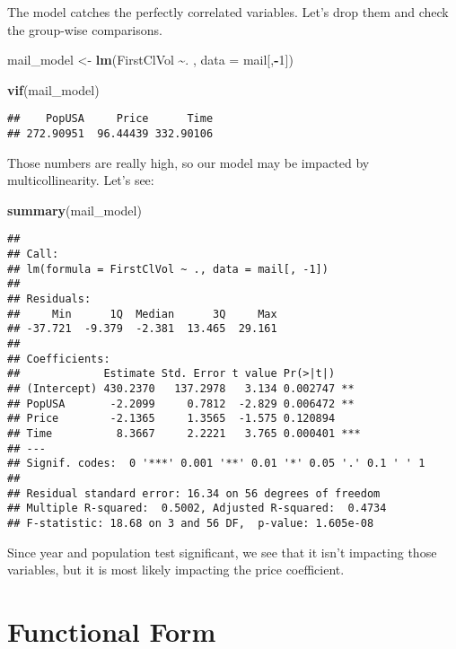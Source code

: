 \documentclass[
]{article}
\newenvironment{Shaded}{\begin{snugshade}}{\end{snugshade}}
\newcommand{\AttributeTok}[1]{\textcolor[rgb]{0.13,0.29,0.53}{#1}}
\newcommand{\DecValTok}[1]{\textcolor[rgb]{0.00,0.00,0.81}{#1}}
\newcommand{\FunctionTok}[1]{\textcolor[rgb]{0.13,0.29,0.53}{\textbf{#1}}}
\newcommand{\NormalTok}[1]{#1}
\newcommand{\OtherTok}[1]{\textcolor[rgb]{0.56,0.35,0.01}{#1}}
\newcommand{\SpecialCharTok}[1]{\textcolor[rgb]{0.81,0.36,0.00}{\textbf{#1}}}
\begin{document}
The model catches the perfectly correlated variables. Let's drop them
and check the group-wise comparisons.

\begin{Shaded}
\begin{Highlighting}[]
\NormalTok{mail\_model }\OtherTok{\textless{}{-}} \FunctionTok{lm}\NormalTok{(FirstClVol }\SpecialCharTok{\textasciitilde{}}\NormalTok{. , }\AttributeTok{data =}\NormalTok{ mail[,}\SpecialCharTok{{-}}\DecValTok{1}\NormalTok{])}

\FunctionTok{vif}\NormalTok{(mail\_model)}
\end{Highlighting}
\end{Shaded}

\begin{verbatim}
##    PopUSA     Price      Time 
## 272.90951  96.44439 332.90106
\end{verbatim}

Those numbers are really high, so our model may be impacted by
multicollinearity. Let's see:

\begin{Shaded}
\begin{Highlighting}[]
\FunctionTok{summary}\NormalTok{(mail\_model)}
\end{Highlighting}
\end{Shaded}

\begin{verbatim}
## 
## Call:
## lm(formula = FirstClVol ~ ., data = mail[, -1])
## 
## Residuals:
##     Min      1Q  Median      3Q     Max 
## -37.721  -9.379  -2.381  13.465  29.161 
## 
## Coefficients:
##             Estimate Std. Error t value Pr(>|t|)    
## (Intercept) 430.2370   137.2978   3.134 0.002747 ** 
## PopUSA       -2.2099     0.7812  -2.829 0.006472 ** 
## Price        -2.1365     1.3565  -1.575 0.120894    
## Time          8.3667     2.2221   3.765 0.000401 ***
## ---
## Signif. codes:  0 '***' 0.001 '**' 0.01 '*' 0.05 '.' 0.1 ' ' 1
## 
## Residual standard error: 16.34 on 56 degrees of freedom
## Multiple R-squared:  0.5002, Adjusted R-squared:  0.4734 
## F-statistic: 18.68 on 3 and 56 DF,  p-value: 1.605e-08
\end{verbatim}

Since year and population test significant, we see that it isn't
impacting those variables, but it is most likely impacting the price
coefficient.

\section{Functional Form}\label{functional-form}
\end{document}
